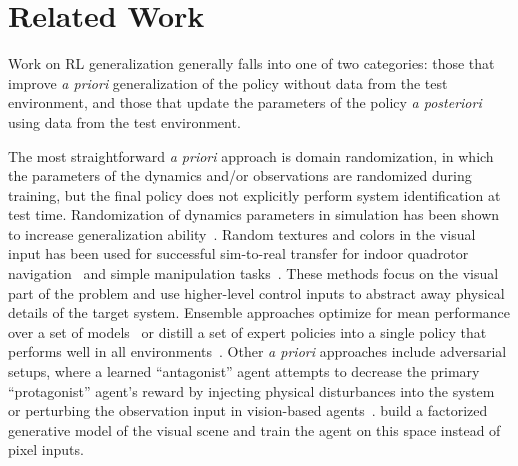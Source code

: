 \documentclass{article}
\begin{document}
\section{Related Work}
Work on RL generalization generally falls into one of two categories: those that improve \emph{a priori} generalization of the policy without data from the test environment,
and those that update the parameters of the policy \emph{a posteriori} using data from the test environment.

The most straightforward \emph{a priori} approach is domain randomization,
in which the parameters of the dynamics and/or observations are randomized during training,
but the final policy does not explicitly perform system identification at test time.
%
Randomization of dynamics parameters in simulation has been shown to increase generalization ability~\citep{antonova-pivoting-corr17, zhu-RL-IL-diverse}.
Random textures and colors in the visual input has been used for successful sim-to-real transfer
for indoor quadrotor navigation~\citep{sadeghi-cad2rl-rss17}
and simple manipulation tasks~\citep{tobin-domainrand-arxiv17,james-domain-xfer}.
These methods focus on the visual part of the problem and use higher-level control inputs
to abstract away physical details of the target system.
Ensemble approaches optimize for mean performance over a set of models~\citep{mordatch-ensemble-icra15}
or distill a set of expert policies into a single policy that performs well in all environments~\citep{actor-mimic,teh-distral}.
%
Other \emph{a priori} approaches include adversarial setups,
where a learned ``antagonist'' agent attempts to decrease the primary ``protagonist'' agent's reward
by injecting physical disturbances into the system~\citep{pinto-robust-adversarial-RL}
or perturbing the observation input in vision-based agents~\citep{huang-adversarial-attacks}.
\citet{higgins-DARLA} build a factorized generative model of the visual scene
and train the agent on this space instead of pixel inputs.
\end{document}
